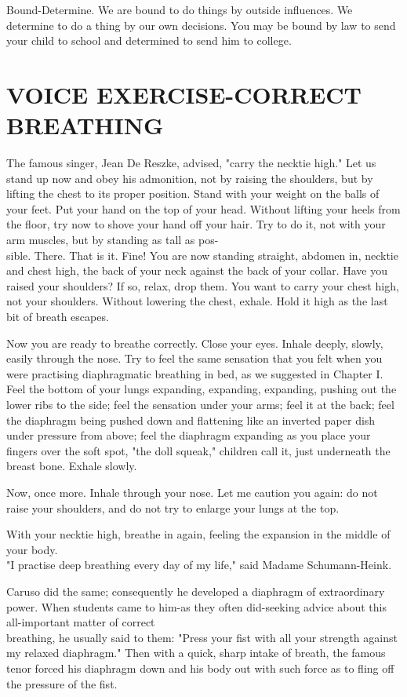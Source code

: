 \documentclass[10pt]{article}
\begin{document}
Bound-Determine. We are bound to do things by outside influences. We determine to do a thing by our own decisions. You may be bound by law to send your child to school and determined to send him to college.

\section*{VOICE EXERCISE-CORRECT BREATHING}
The famous singer, Jean De Reszke, advised, "carry the necktie high." Let us stand up now and obey his admonition, not by raising the shoulders, but by lifting the chest to its proper position. Stand with your weight on the balls of your feet. Put your hand on the top of your head. Without lifting your heels from the floor, try now to shove your hand off your hair. Try to do it, not with your arm muscles, but by standing as tall as pos-\\
sible. There. That is it. Fine! You are now standing straight, abdomen in, necktie and chest high, the back of your neck against the back of your collar. Have you raised your shoulders? If so, relax, drop them. You want to carry your chest high, not your shoulders. Without lowering the chest, exhale. Hold it high as the last bit of breath escapes.

Now you are ready to breathe correctly. Close your eyes. Inhale deeply, slowly, easily through the nose. Try to feel the same sensation that you felt when you were practising diaphragmatic breathing in bed, as we suggested in Chapter I. Feel the bottom of your lungs expanding, expanding, expanding, pushing out the lower ribs to the side; feel the sensation under your arms; feel it at the back; feel the diaphragm being pushed down and flattening like an inverted paper dish under pressure from above; feel the diaphragm expanding as you place your fingers over the soft spot, "the doll squeak," children call it, just underneath the breast bone. Exhale slowly.

Now, once more. Inhale through your nose. Let me caution you again: do not raise your shoulders, and do not try to enlarge your lungs at the top.

With your necktie high, breathe in again, feeling the expansion in the middle of your body.\\
"I practise deep breathing every day of my life," said Madame Schumann-Heink.

Caruso did the same; consequently he developed a diaphragm of extraordinary power. When students came to him-as they often did-seeking advice about this all-important matter of correct\\
breathing, he usually said to them: "Press your fist with all your strength against my relaxed diaphragm." Then with a quick, sharp intake of breath, the famous tenor forced his diaphragm down and his body out with such force as to fling off the pressure of the fist.
\end{document}
